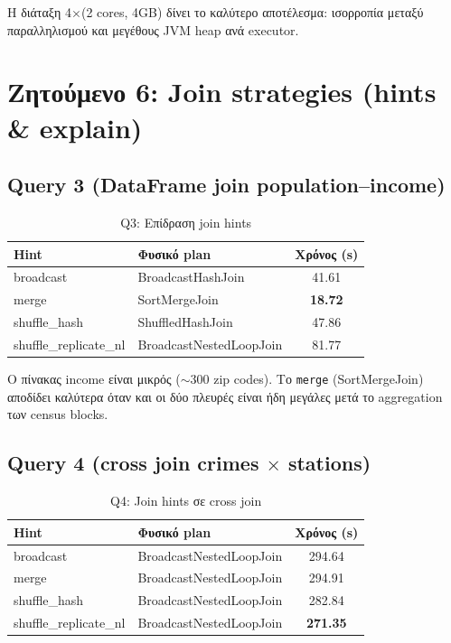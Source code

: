 \documentclass[11pt,a4paper]{article}
\begin{document}
Η διάταξη 4$\times$(2 cores, 4GB) δίνει το καλύτερο αποτέλεσμα: ισορροπία
μεταξύ παραλληλισμού και μεγέθους JVM heap ανά executor.

\section{Ζητούμενο 6: Join strategies (hints \& explain)}

\subsection{Query 3 (DataFrame join population--income)}

\begin{table}[h]
\centering
\caption{Q3: Επίδραση join hints}
\begin{tabular}{llc}
\toprule
Hint & Φυσικό plan & Χρόνος (s) \\
\midrule
broadcast & BroadcastHashJoin & 41.61 \\
merge & SortMergeJoin & \textbf{18.72} \\
shuffle\_hash & ShuffledHashJoin & 47.86 \\
shuffle\_replicate\_nl & BroadcastNestedLoopJoin & 81.77 \\
\bottomrule
\end{tabular}
\end{table}

Ο πίνακας income είναι μικρός ($\sim$300 zip codes). Το \texttt{merge}
(SortMergeJoin) αποδίδει καλύτερα όταν και οι δύο πλευρές είναι ήδη
μεγάλες μετά το aggregation των census blocks.

\subsection{Query 4 (cross join crimes $\times$ stations)}

\begin{table}[h]
\centering
\caption{Q4: Join hints σε cross join}
\begin{tabular}{llc}
\toprule
Hint & Φυσικό plan & Χρόνος (s) \\
\midrule
broadcast & BroadcastNestedLoopJoin & 294.64 \\
merge & BroadcastNestedLoopJoin & 294.91 \\
shuffle\_hash & BroadcastNestedLoopJoin & 282.84 \\
shuffle\_replicate\_nl & BroadcastNestedLoopJoin & \textbf{271.35} \\
\bottomrule
\end{tabular}
\end{table}
\end{document}
